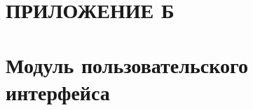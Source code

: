 \section*{ПРИЛОЖЕНИЕ Б}
\section*{Модуль пользовательского интерфейса}
\setcounter{lstlisting}{0}
\renewcommand{\thelstlisting}{Б.\arabic{lstlisting}} %




\pagebreak
